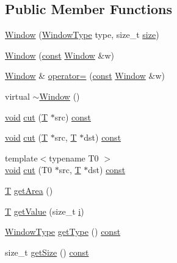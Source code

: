 \subsection*{Public Member Functions}
\begin{DoxyCompactItemize}
\item 
\hyperlink{class_window_aac25f1a9d97f8ce60a63efaee30aec63}{Window} (\hyperlink{class_window_af334e9ffc511fb6b24db90a1a5c56007}{Window\+Type} type, size\+\_\+t \hyperlink{group__lavu__mem_ga854352f53b148adc24983a58a1866d66}{size})
\item 
\hyperlink{class_window_a473ed3015221458443303d0a47a57f79}{Window} (\hyperlink{getopt1_8c_a2c212835823e3c54a8ab6d95c652660e}{const} \hyperlink{class_window}{Window} \&w)
\item 
\hyperlink{class_window}{Window} \& \hyperlink{class_window_a190dd30bdc412aec2f1f0520a26cc218}{operator=} (\hyperlink{getopt1_8c_a2c212835823e3c54a8ab6d95c652660e}{const} \hyperlink{class_window}{Window} \&w)
\item 
virtual \hyperlink{class_window_a9ee2e5eb7634b6cd337d6ec3e24a39f5}{$\sim$\+Window} ()
\item 
\hyperlink{sound_8c_ae35f5844602719cf66324f4de2a658b3}{void} \hyperlink{class_window_ac5f49d72e44ca7e36d650b352a3a11e3}{cut} (\hyperlink{xmltchar_8h_a16a0f7e7053a679c9bf4289b441a2be7}{T} $\ast$src) \hyperlink{getopt1_8c_a2c212835823e3c54a8ab6d95c652660e}{const} 
\item 
\hyperlink{sound_8c_ae35f5844602719cf66324f4de2a658b3}{void} \hyperlink{class_window_abb057459baf54a61b57676594b552009}{cut} (\hyperlink{xmltchar_8h_a16a0f7e7053a679c9bf4289b441a2be7}{T} $\ast$src, \hyperlink{xmltchar_8h_a16a0f7e7053a679c9bf4289b441a2be7}{T} $\ast$dst) \hyperlink{getopt1_8c_a2c212835823e3c54a8ab6d95c652660e}{const} 
\item 
{\footnotesize template$<$typename T0 $>$ }\\\hyperlink{sound_8c_ae35f5844602719cf66324f4de2a658b3}{void} \hyperlink{class_window_aa30e3e53a02fb487b96f1f43396f1833}{cut} (T0 $\ast$src, \hyperlink{xmltchar_8h_a16a0f7e7053a679c9bf4289b441a2be7}{T} $\ast$dst) \hyperlink{getopt1_8c_a2c212835823e3c54a8ab6d95c652660e}{const} 
\item 
\hyperlink{xmltchar_8h_a16a0f7e7053a679c9bf4289b441a2be7}{T} \hyperlink{class_window_af3ae12cdad7e2b324146c101c8ed85e4}{get\+Area} ()
\item 
\hyperlink{xmltchar_8h_a16a0f7e7053a679c9bf4289b441a2be7}{T} \hyperlink{class_window_ab38564f8627e1c3dbc5653cadb9f64c4}{get\+Value} (size\+\_\+t \hyperlink{checksum_8c_ab80e330a3bc9e38c1297fe17381e92b4}{i})
\item 
\hyperlink{class_window_af334e9ffc511fb6b24db90a1a5c56007}{Window\+Type} \hyperlink{class_window_a7646cc968381558237fecd8a3fdb85b8}{get\+Type} () \hyperlink{getopt1_8c_a2c212835823e3c54a8ab6d95c652660e}{const} 
\item 
size\+\_\+t \hyperlink{class_window_a0e88560cdc7ffabbe43f96797349da8e}{get\+Size} () \hyperlink{getopt1_8c_a2c212835823e3c54a8ab6d95c652660e}{const} 
\end{DoxyCompactItemize}
